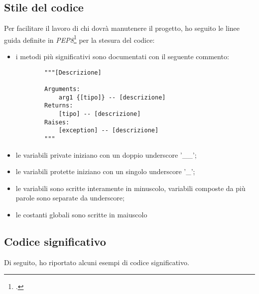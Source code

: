 \subsection{Stile del codice}
Per facilitare il lavoro di chi dovrà manutenere il progetto, ho seguito le linee guida definite in \textit{PEP8}\footcite{site:pep8} per la stesura del codice:
\begin{itemize}
    \item i metodi più significativi sono documentati con il seguente commento:
    \begin{lstlisting}
        """[Descrizione]

        Arguments:
            arg1 {[tipo]} -- [descrizione]
        Returns:
            [tipo] -- [descrizione]
        Raises:
            [exception] -- [descrizione]
        """
    \end{lstlisting}
    \item le variabili private iniziano con un doppio underscore '\_\_';
    \item le variabili protette iniziano con un singolo underscore '\_';
    \item le variabili sono scritte interamente in minuscolo, variabili composte da più parole sono separate da underscore;
    \item le costanti globali sono scritte in maiuscolo
\end{itemize}

\subsection{Codice significativo}

Di seguito, ho riportato alcuni esempi di codice significativo.
